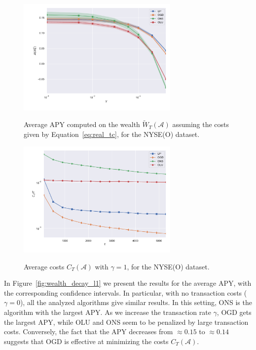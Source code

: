 \begin{figure}[ht!]
\centering
{\includegraphics[width=0.70\textwidth,keepaspectratio]{img/fig_w_decay_true.pdf}} 
\caption{ Average APY computed on the wealth $\tilde{W}_T(\mathcal A)$ assuming the costs given by Equation~\eqref{eq:real_tc}, for the NYSE(O) dataset.}
\label{fig:wealth_decay_true}
\end{figure}

\begin{figure}[ht!]
\centering
{\includegraphics[width=0.70\textwidth,keepaspectratio]{img/fig_costs.pdf}}
\caption{Average costs $C_T(\mathcal{A})$ with $\gamma = 1$, for the NYSE(O) dataset.}
\label{fig:costs}
\end{figure}

In Figure~\ref{fig:wealth_decay_l1} we present the results for the average APY, with the corresponding confidence intervals.
In particular, with no transaction costs ($\gamma = 0$), all the analyzed algorithms give similar results.
In this setting, ONS is the algorithm with the largest APY.
As we increase the transaction rate $\gamma$, OGD gets the largest APY, while OLU and ONS seem to be penalized by large transaction costs.
Conversely, the fact that the APY decreases from $\approx 0.15$ to $\approx 0.14$ suggests that OGD is effective at minimizing the costs $C_T(\mathcal{A})$.

